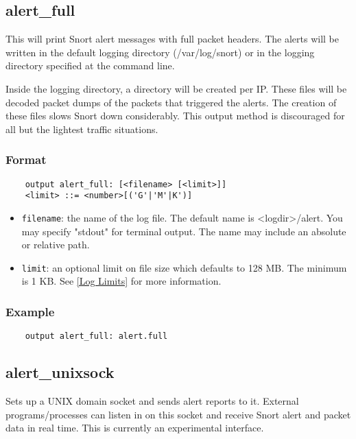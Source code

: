 \documentclass[english]{report}
\begin{document}
\subsection{alert\_full}

This will print Snort alert messages with full packet headers. The alerts will
be written in the default logging directory (/var/log/snort) or in the logging
directory specified at the command line.

Inside the logging directory, a directory will be created per IP.  These files
will be decoded packet dumps of the packets that triggered the alerts. The
creation of these files slows Snort down considerably.  This output method is
discouraged for all but the lightest traffic situations.

\subsubsection{Format}

\begin{verbatim}
    output alert_full: [<filename> [<limit>]]
    <limit> ::= <number>[('G'|'M'|K')]
\end{verbatim}

\begin{itemize}
\item \texttt{filename}: the name of the log file.  The default name is
<logdir>/alert.  You may specify "stdout" for terminal output.  The name may
include an absolute or relative path.

\item \texttt{limit}: an optional limit on file size which defaults to 128 MB.  
The minimum is 1 KB.  See \ref{Log Limits} for more information.
\end{itemize}

\subsubsection{Example}

\begin{verbatim}
    output alert_full: alert.full
\end{verbatim}

\subsection{alert\_unixsock}

Sets up a UNIX domain socket and sends alert reports to it. External
programs/processes can listen in on this socket and receive Snort alert and
packet data in real time. This is currently an experimental interface.
\end{document}
